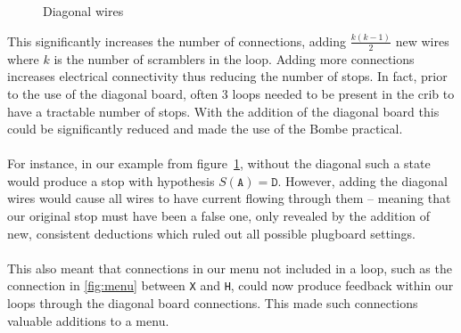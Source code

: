 \begin{figure}[H]
\begin{center}
	\end{center}
	\caption{Diagonal wires}
	\label{fig:diagonal}
\end{figure}
\noindent This significantly increases the number of connections,
adding $\frac{k(k-1)}{2}$ new wires where $k$ is the number of
scramblers in the loop. Adding more connections increases electrical
connectivity thus reducing the number of stops. In fact, prior to the
use of the diagonal board, often $3$ loops needed to be present in
the crib to have a tractable number of stops. With the addition of
the diagonal board this could be significantly reduced and made the
use of the Bombe practical.
\\\\For instance, in our example from figure~\ref{fig:diagonal},
without the diagonal such a state would produce a stop with
hypothesis $S(\texttt{A}) = \texttt{D}$. However, adding the diagonal
wires would cause all wires to have current flowing through them --
meaning that our original stop must have been a false one, only
revealed by the addition of new, consistent deductions which ruled
out all possible plugboard settings.
\\\\This also meant that connections in our menu not included in a
loop, such as the connection in \ref{fig:menu} between \texttt{X} and
\texttt{H}, could now produce feedback within our loops through the
diagonal board connections. This made such connections valuable
additions to a menu.
